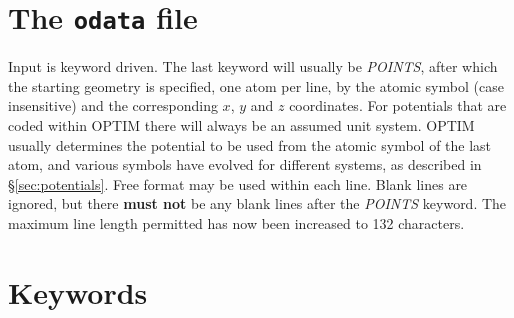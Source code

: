 \documentclass[12pt,a4paper,dvips]{article}
\begin{document}
\section{The {\tt odata} file}
\label{sec:odata}
Input is keyword driven.
The last keyword will usually be {\it POINTS\/}, after which 
the starting geometry is specified, one atom per line, by the atomic symbol (case
insensitive) and the corresponding $x$, $y$ and $z$ coordinates. For potentials that
are coded within OPTIM there will always be an assumed unit system.
OPTIM usually determines the potential to be used from the atomic
symbol of the last atom, and various symbols have evolved for different systems, as
described in \S\ref{sec:potentials}. Free format may be used within each line. Blank lines are ignored,
but there {\bf must not} be any blank lines after the {\it POINTS\/} keyword.
The maximum line length permitted has now been increased to 132 characters.

\section{Keywords}
\label{sec:keywords}
\label{sect:keywords}
\end{document}
